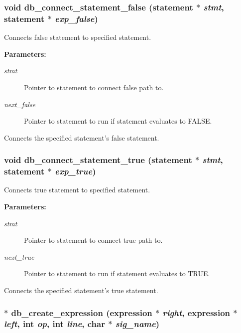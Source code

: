 \subsubsection{\setlength{\rightskip}{0pt plus 5cm}void db\_\-connect\_\-statement\_\-false ({\bf statement} $\ast$ {\em stmt}, {\bf statement} $\ast$ {\em exp\_\-false})}\label{db_8c_a34}


Connects false statement to specified statement.

\begin{Desc}
\item[{\bf Parameters: }]\par
\begin{description}
\item[
{\em stmt}]Pointer to statement to connect false path to. \item[
{\em next\_\-false}]Pointer to statement to run if statement evaluates to FALSE.

\end{description}
\end{Desc}
Connects the specified statement's false statement. 
\subsubsection{\setlength{\rightskip}{0pt plus 5cm}void db\_\-connect\_\-statement\_\-true ({\bf statement} $\ast$ {\em stmt}, {\bf statement} $\ast$ {\em exp\_\-true})}\label{db_8c_a33}


Connects true statement to specified statement.

\begin{Desc}
\item[{\bf Parameters: }]\par
\begin{description}
\item[
{\em stmt}]Pointer to statement to connect true path to. \item[
{\em next\_\-true}]Pointer to statement to run if statement evaluates to TRUE.

\end{description}
\end{Desc}
Connects the specified statement's true statement. 
\subsubsection{ $\ast$ db\_\-create\_\-expression ({\bf expression} $\ast$ {\em right}, {\bf expression} $\ast$ {\em left}, int {\em op}, int {\em line}, char $\ast$ {\em sig\_\-name})}\label{db_8c_a28}


